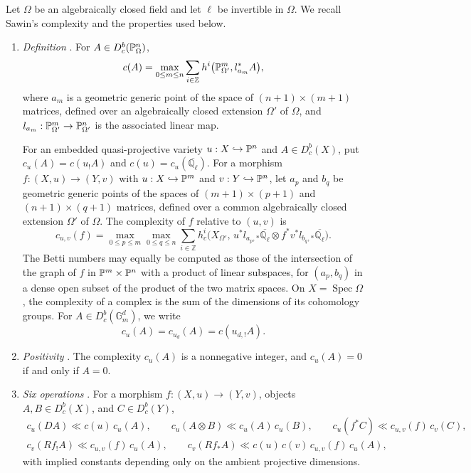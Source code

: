 \documentclass[12pt,reqno]{amsart}
\theoremstyle{definition}
\theoremstyle{plain}
\theoremstyle{definition}
\theoremstyle{remark}
\newcommand{\bbG}{\mathbb{G}}  \newcommand{\bbH}{\mathbb{H}}
\newcommand{\bbQ}{\mathbb{Q}}  \newcommand{\bbR}{\mathbb{R}}
\newcommand{\ol}[1]{\overline{#1}}
\newcommand{\Ql}{\bbQ_{\ell}}
\newcommand{\Db}{D^b_c}
\newcommand{\Gm}{\bbG_m}
\newcommand{\cu}{c_u}
\begin{document}
Let \(\Omega\) be an algebraically closed field and let \(\ell\) be invertible in \(\Omega\).  We recall
Sawin's complexity and the properties used below.

\begin{enumerate}[label=\textup{(C\arabic*)}, ref=\textup{(C\arabic*)}]
\item\label{item:C1} \emph{Definition} \cite[Defs.~3.2, 6.3, 6.5, 6.6]{SFFK23}.  For
\(A\in\Db(\bbP^n_\Omega)\),
\[
        c(A)=\max_{0\le m\le n}\sum_{i\in\mathbb Z}
        h^i\bigl(\mathbb{P}^m_{\Omega'},l_{a_m}^*A\bigr),
\]
where \(a_m\) is a geometric generic point of the space of \((n+1)\times(m+1)\) matrices, defined over
an algebraically closed extension \(\Omega'\) of \(\Omega\), and
\(l_{a_m}:\mathbb{P}^m_{\Omega'}\to\mathbb{P}^n_{\Omega'}\) is the associated linear map.

For an embedded quasi-projective variety \(u:X\hookrightarrow\mathbb{P}^n\) and \(A\in\Db(X)\), put
\(c_u(A)=c(u_!A)\) and \(c(u)=c_u(\ol\Ql)\).
For a morphism \(f:(X,u)\to(Y,v)\) with \(u:X\hookrightarrow\mathbb{P}^m\) and \(v:Y\hookrightarrow\mathbb{P}^n\),
let \(a_p\) and \(b_q\) be geometric generic points of the spaces of \((m+1)\times(p+1)\) and
\((n+1)\times(q+1)\) matrices, defined over a common algebraically closed extension \(\Omega'\) of
\(\Omega\).  The complexity of \(f\) relative to \((u,v)\) is
\[
        c_{u,v}(f)=\max_{0\le p\le m}\max_{0\le q\le n}\sum_{i\in\mathbb Z}
        h^i_c\bigl(X_{\Omega'},\,u^*l_{a_p,*}\ol\Ql\otimes f^*v^*l_{b_q,*}\ol\Ql\bigr).
\]
The Betti numbers may equally be computed as those of the intersection of the graph of \(f\) in
\(\mathbb{P}^m\times\mathbb{P}^n\) with a product of linear subspaces, for \((a_p,b_q)\) in a dense open subset of
the product of the two matrix spaces.  On
\(X=\operatorname{Spec}\Omega\), the complexity of a complex is the sum of the dimensions of its
cohomology groups.  For \(A\in\Db(\Gm^d)\), we write
\[
        \cu(A)=c_{u_d}(A)=c(u_{d,!}A).
\]

\item\label{item:C2} \emph{Positivity} \cite[Prop.~3.4, Rem.~6.4]{SFFK23}.  The complexity
\(c_u(A)\) is a nonnegative integer, and \(c_u(A)=0\) if and only if \(A=0\).

\item\label{item:C3} \emph{Six operations} \cite[Th.~6.8, estimates~(6.1), (6.2), (6.5), (6.6), (6.8)]{SFFK23}.
For a morphism \(f:(X,u)\to(Y,v)\), objects \(A,B\in\Db(X)\), and \(C\in\Db(Y)\),
\[
\begin{gathered}
        c_u(DA)\ll c(u)\,c_u(A),
        \qquad
        c_u(A\otimes B)\ll c_u(A)\,c_u(B),
        \qquad
        c_u(f^*C)\ll c_{u,v}(f)\,c_v(C),\\
        c_v(Rf_!A)\ll c_{u,v}(f)\,c_u(A),
        \qquad
        c_v(Rf_*A)\ll c(u)\,c(v)\,c_{u,v}(f)\,c_u(A),
\end{gathered}
\]
with implied constants depending only on the ambient projective dimensions.


\end{enumerate}
\end{document}
